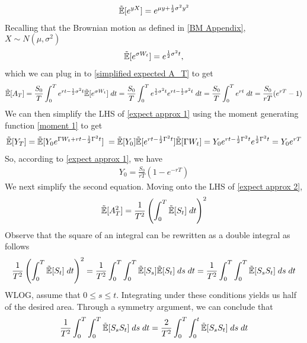 \documentclass[reqno]{amsart}
\newcommand{\rE}[1]{\tilde{\E}[#1]}
\begin{document}
\begin{align} \label{moment 1}
     \rE{e^{yX}}
     = e^{\mu y + \frac{1}{2} \sigma^2 y^2}
\end{align}
Recalling that the Brownian motion as defined in \eqref{BM Appendix}, $X \sim N(\mu, \sigma^2)$
\begin{align} 
     \rE{e^{\sigma W_t}}
     = e^{\frac{1}{2}\sigma^2 t},
\end{align}
which we can plug in to \eqref{simplified expected A_T} to get
\begin{align} 
     \rE{A_T}
     = \frac{S_0}{T} \int_0^T e^{rt-\frac{1}{2}\sigma^2t} \rE{e^{\sigma W_t}}  \; dt
     = \frac{S_0}{T} \int_0^T e^{\frac{1}{2}\sigma^2 t} e^{rt-\frac{1}{2}\sigma^2t} \; dt
     = \frac{S_0}{T} \int_0^T e^{rt} \; dt
     = \frac{S_0}{rT} (e^{rT}-1)
\end{align}
We can then simplify the LHS of \eqref{expect approx 1} using the moment generating function \eqref{moment 1} to get
\begin{align} 
     \rE{Y_T} 
     = \rE{Y_0e^{\Gamma W_t+rt-\frac{1}{2}\Gamma^2t}} \;
     = \rE{Y_0} \rE{e^{rt - \frac{1}{2}\Gamma^2t}} \rE{\Gamma W_t}
     = Y_0 e^{rt - \frac{1}{2}\Gamma^2t} e^{\frac{1}{2}\Gamma^2 t}
     = Y_0 e^{rT}
\end{align}
So, according to \eqref{expect approx 1}, we have
\begin{align} \label{calibration 1 r neq 0}
     Y_0 = \frac{S_0}{rT}(1-e^{-rT})
\end{align}
We next simplify the second equation. Moving onto the LHS of \eqref{expect approx 2},
\begin{align}
     \rE{A_T^2}
     = {\frac{1}{T^2} \left(\int_0^T \rE{S_t} \; dt\right)^2}
\end{align}
Observe that the square of an integral can be rewritten as a double integral as follows
\begin{align}
     {\frac{1}{T^2} \left(\int_0^T \rE{S_t} \; dt\right)^2}
     = {\frac{1}{T^2} \int_0^T \int_0^T \rE{S_s} \rE{S_t} \; ds \; dt}
     = {\frac{1}{T^2} \int_0^T \int_0^T \rE{S_s S_t} \; ds \; dt}
\end{align}
WLOG, assume that $0 \leq s \leq t$. Integrating under these conditions yields us half of the desired area. Through a symmetry argument, we can conclude that
\begin{align}
     {\frac{1}{T^2} \int_0^T \int_0^T \rE{S_s S_t} \; ds \; dt}
     = {\frac{2}{T^2} \int_0^T \int_0^t \rE{S_s S_t} \; ds \; dt}
\end{align}
\end{document}
